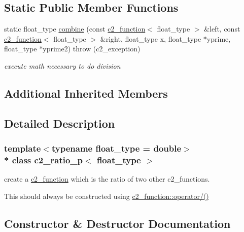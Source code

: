 \subsection*{Static Public Member Functions}
\begin{DoxyCompactItemize}
\item 
static float\+\_\+type \hyperlink{classc2__ratio__p_a9b45af413e3861a37d169eefa8d93fb9}{combine} (const \hyperlink{classc2__function}{c2\+\_\+function}$<$ float\+\_\+type $>$ \&left, const \hyperlink{classc2__function}{c2\+\_\+function}$<$ float\+\_\+type $>$ \&right, float\+\_\+type x, float\+\_\+type $\ast$yprime, float\+\_\+type $\ast$yprime2)  throw (c2\+\_\+exception)
\begin{DoxyCompactList}\small\item\em execute math necessary to do division \end{DoxyCompactList}\end{DoxyCompactItemize}
\subsection*{Additional Inherited Members}


\subsection{Detailed Description}
\subsubsection*{template$<$typename float\+\_\+type = double$>$\\*
class c2\+\_\+ratio\+\_\+p$<$ float\+\_\+type $>$}

create a \hyperlink{classc2__function}{c2\+\_\+function} which is the ratio of two other c2\+\_\+functions.

This should always be constructed using \hyperlink{classc2__function_a93ac28dfe5daebea84d147b8e346e60c}{c2\+\_\+function\+::operator/()} 

\subsection{Constructor \& Destructor Documentation}
